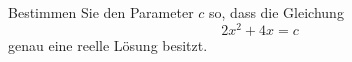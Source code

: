 \begin{ExerciseBlock}
Bestimmen Sie den Parameter $c$ so, dass die Gleichung
\begin{equation*}
  2x^2+4x=c
\end{equation*}
genau eine reelle Lösung besitzt.

\end{ExerciseBlock}
